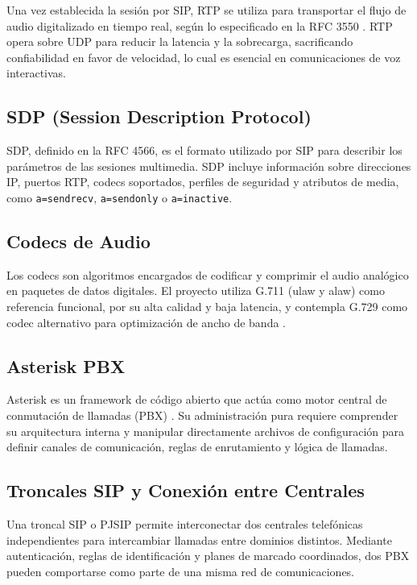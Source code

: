 \documentclass[12pt,a4paper]{article}
\begin{document}
Una vez establecida la sesión por SIP, RTP se utiliza para transportar el flujo de audio digitalizado en tiempo real, según lo especificado en la RFC 3550 \cite{rfc3550}. RTP opera sobre UDP para reducir la latencia y la sobrecarga, sacrificando confiabilidad en favor de velocidad, lo cual es esencial en comunicaciones de voz interactivas.

\subsection{SDP (Session Description Protocol)}

SDP, definido en la RFC 4566, es el formato utilizado por SIP para describir los parámetros de las sesiones multimedia. SDP incluye información sobre direcciones IP, puertos RTP, codecs soportados, perfiles de seguridad y atributos de media, como \texttt{a=sendrecv}, \texttt{a=sendonly} o \texttt{a=inactive}.

\subsection{Codecs de Audio}

Los codecs son algoritmos encargados de codificar y comprimir el audio analógico en paquetes de datos digitales. El proyecto utiliza G.711 (ulaw y alaw) como referencia funcional, por su alta calidad y baja latencia, y contempla G.729 como codec alternativo para optimización de ancho de banda \cite{itu_g}.

\subsection{Asterisk PBX}

Asterisk es un framework de código abierto que actúa como motor central de conmutación de llamadas (PBX) \cite{asterisk_book}. Su administración pura requiere comprender su arquitectura interna y manipular directamente archivos de configuración para definir canales de comunicación, reglas de enrutamiento y lógica de llamadas.

\subsection{Troncales SIP y Conexión entre Centrales}

Una troncal SIP o PJSIP permite interconectar dos centrales telefónicas independientes para intercambiar llamadas entre dominios distintos. Mediante autenticación, reglas de identificación y planes de marcado coordinados, dos PBX pueden comportarse como parte de una misma red de comunicaciones.
\end{document}

